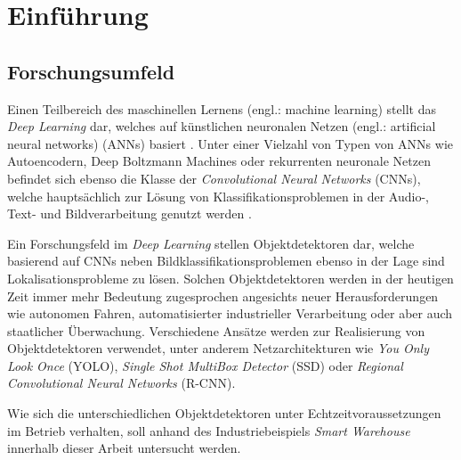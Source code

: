 \chapter{Einführung}

\section{Forschungsumfeld}

Einen Teilbereich des maschinellen Lernens (engl.: machine learning) stellt das \textit{Deep Learning} dar, welches auf künstlichen neuronalen Netzen (engl.: artificial neural networks) (ANNs) basiert \cite[S. 253]{AurelienGeron.2018}. Unter einer Vielzahl von Typen von ANNs wie Autoencodern, Deep Boltzmann Machines oder rekurrenten neuronale Netzen befindet sich ebenso die Klasse der \textit{Convolutional Neural Networks} (CNNs), welche hauptsächlich zur Lösung von Klassifikationsproblemen in der Audio-, Text- und Bildverarbeitung genutzt werden \cite{MathWorks.2019}.

Ein Forschungsfeld im \textit{Deep Learning} stellen Objektdetektoren dar, welche basierend auf CNNs neben Bildklassifikationsproblemen ebenso in der Lage sind Lokalisationsprobleme zu lösen. Solchen Objektdetektoren werden in der heutigen Zeit immer mehr Bedeutung zugesprochen angesichts neuer Herausforderungen wie autonomen Fahren, automatisierter industrieller Verarbeitung oder aber auch staatlicher Überwachung. Verschiedene Ansätze werden zur Realisierung von Objektdetektoren verwendet, unter anderem Netzarchitekturen wie \textit{You Only Look Once} (YOLO), \textit{Single Shot MultiBox Detector} (SSD) oder \textit{Regional Convolutional Neural Networks} (R-CNN). 

Wie sich die unterschiedlichen Objektdetektoren unter Echtzeitvoraussetzungen im Betrieb verhalten, soll anhand des Industriebeispiels \textit{Smart Warehouse} innerhalb dieser Arbeit untersucht werden. 
